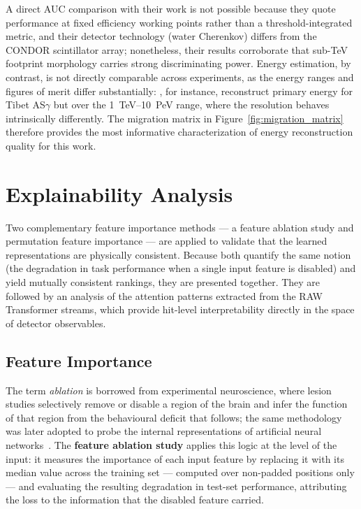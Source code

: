 A direct AUC comparison with their work is not possible because they quote performance at fixed efficiency working points rather than a threshold-integrated metric, and their detector technology (water Cherenkov) differs from the CONDOR scintillator array; nonetheless, their results corroborate that sub-TeV footprint morphology carries strong discriminating power. Energy estimation, by contrast, is not directly comparable across experiments, as the energy ranges and figures of merit differ substantially: , for instance, reconstruct primary energy for Tibet AS$\gamma$ but over the 1~TeV--10~PeV range, where the resolution behaves intrinsically differently. The migration matrix in Figure~\ref{fig:migration_matrix} therefore provides the most informative characterization of energy reconstruction quality for this work.

\section{Explainability Analysis}
\label{sec:explainability}

Two complementary feature importance methods --- a feature ablation study and permutation feature importance --- are applied to validate that the learned representations are physically consistent. Because both quantify the same notion (the degradation in task performance when a single input feature is disabled) and yield mutually consistent rankings, they are presented together. They are followed by an analysis of the attention patterns extracted from the RAW Transformer streams, which provide hit-level interpretability directly in the space of detector observables.

\subsection{Feature Importance}
\label{subsec:feature_importance}

The term \emph{ablation} is borrowed from experimental neuroscience, where lesion studies selectively remove or disable a region of the brain and infer the function of that region from the behavioural deficit that follows; the same methodology was later adopted to probe the internal representations of artificial neural networks~. The \textbf{feature ablation study} applies this logic at the level of the input: it measures the importance of each input feature by replacing it with its median value across the training set --- computed over non-padded positions only --- and evaluating the resulting degradation in test-set performance, attributing the loss to the information that the disabled feature carried.

